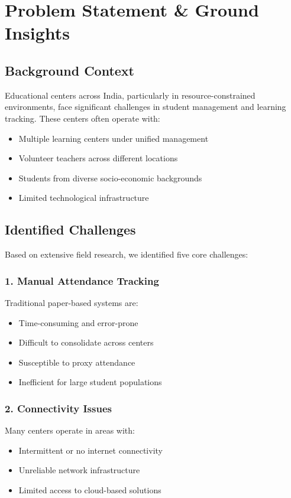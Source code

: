\documentclass[12pt,a4paper]{article}
\begin{document}
\section{Problem Statement \& Ground Insights}

\subsection{Background Context}
Educational centers across India, particularly in resource-constrained environments, face significant challenges in student management and learning tracking. These centers often operate with:
\begin{itemize}[leftmargin=*, itemsep=0.2em]
    \item Multiple learning centers under unified management
    \item Volunteer teachers across different locations
    \item Students from diverse socio-economic backgrounds
    \item Limited technological infrastructure
\end{itemize}

\subsection{Identified Challenges}
Based on extensive field research, we identified five core challenges:

\subsubsection{1. Manual Attendance Tracking}
Traditional paper-based systems are:
\begin{itemize}[leftmargin=*, itemsep=0.2em]
    \item Time-consuming and error-prone
    \item Difficult to consolidate across centers
    \item Susceptible to proxy attendance
    \item Inefficient for large student populations
\end{itemize}

\subsubsection{2. Connectivity Issues}
Many centers operate in areas with:
\begin{itemize}[leftmargin=*, itemsep=0.2em]
    \item Intermittent or no internet connectivity
    \item Unreliable network infrastructure
    \item Limited access to cloud-based solutions
\end{itemize}
\end{document}
